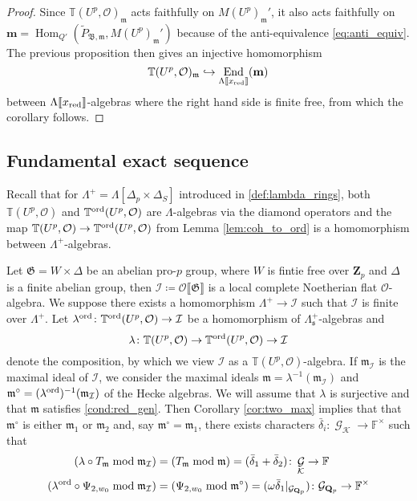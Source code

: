 \documentclass[leqno]{amsart}
\theoremstyle{definition}
\theoremstyle{remark}
\newcommand{\oo}{\mathcal{O}}
\newcommand{\fF}{\mathbb{F}} %
\newcommand{\Qp}{\mathbf{Q}_p}
\newcommand{\Zp}{\mathbf{Z}_p}
\DeclareMathOperator{\End}{End}
\DeclareMathOperator{\Hom}{Hom}
\DeclareMathOperator{\Gal}{\mathcal{G}}
\newcommand{\fm}{\mathfrak{m}}
\newcommand{\fs}{\mathfrak{s}}
\newcommand{\Gp}{\mathcal{G}_{\Qp}} %
\newcommand{\B}{\mathfrak B} %
\newcommand{\xx}{x_\textnormal{red}}
\newcommand{\K}{{\mathcal{K}}} %
\newcommand{\fG}{\mathfrak{G}}
\newcommand{\TT}{\mathbb{T}} %
\newcommand{\I}{\mathcal{I}} %
\newcommand{\ord}{\textnormal{ord}} %
\begin{document}
\begin{proof}
Since $\TT(U^p,\oo)_{\fm}$ acts faithfully on 
$M(U^p)_{\fm}'$, it also acts faithfully on
$\mathbf{m}=\Hom_{Q'}(\tilde{P}_{\B,\fm},M(U^p)_{\fm}')$ 
because of the anti-equivalence \eqref{eq:anti_equiv}.
The previous proposition then gives an injective homomorphism
\[
    \TT(U^p,\oo)_\fm\hookrightarrow
    \End_{\Lambda\llbracket\xx\rrbracket}(\mathbf{m})
\]
between $\Lambda\llbracket\xx\rrbracket$-algebras
where the right hand side is finite free,
from which the corollary follows.
\end{proof}

\subsection{Fundamental exact sequence}
\label{sub:fund_exact_sequence}

Recall that for $\Lambda^+=\Lambda[\Delta_p\times\Delta_S]$
introduced in \eqref{def:lambda_rings},
both $\TT(U^p,\oo)$ and $\TT^{\ord}(U^p,\oo)$
are $\Lambda$-algebras via the diamond operators
and the map 
$\TT(U^p,\oo)\to \TT^{\ord}(U^p,\oo)$
from Lemma \ref{lem:coh_to_ord}
is a homomorphism between $\Lambda^+$-algebras.


Let $\fG=W\times \Delta$ be an abelian pro-$p$ group,
where $W$ is fintie free over $\Zp$
and $\Delta$ is a finite abelian group,
then $\I\coloneqq\oo\llbracket\fG\rrbracket$
is a local complete Noetherian flat $\oo$-algebra.
We suppose there exists a homomorphism
$\Lambda^+\to \I$ such that 
$\I$ is finite over $\Lambda^+$.
Let $\lambda^{\ord}\colon 
\TT^{\ord}(U^p,\oo)\to\I$
be a homomorphism of $\Lambda^+_{\fs}$-algebras and
\begin{equation}
    \lambda\colon 
    \TT(U^p,\oo)\to
    \TT^{\ord}(U^p,\oo)\to\I
\end{equation}
denote the composition, by which
we view $\I$ as a $\TT(U^p,\oo)$-algebra.
If $\fm_\I$ is the maximal ideal of $\I$,
we consider the maximal ideals
$\fm=\lambda^{-1}(\fm_\I)$ 
and $\fm^\circ=(\lambda^{\ord})^{-1}(\fm_\I)$
of the Hecke algebras.
We will assume that
$\lambda$ is surjective and that 
$\fm$ satisfies \eqref{cond:red_gen}.
Then Corollary \ref{cor:two_max} implies that
that $\fm^\circ$ is either $\fm_1$ or $\fm_2$ and,
say $\fm^{\circ}=\fm_1$,
there exists characters 
$\bar{\delta}_i\colon \Gal_\K\to \fF^\times$ such that
\begin{align*}
    (\lambda\circ T_\fm\bmod \fm_\I)&=
    (T_\fm\bmod \fm)=
    (\bar{\delta}_1+\bar{\delta}_2)\colon 
    \Gal_\K\to \fF\\
    (\lambda^{\ord}\circ \Psi_{2,w_0}\bmod\fm_\I)&=
    (\Psi_{2,w_0}\bmod\fm^{\circ})=
    (\omega\bar{\delta}_1\vert_{\Gp})\colon 
    \Gp\to \fF^\times
\end{align*}
\end{document}
